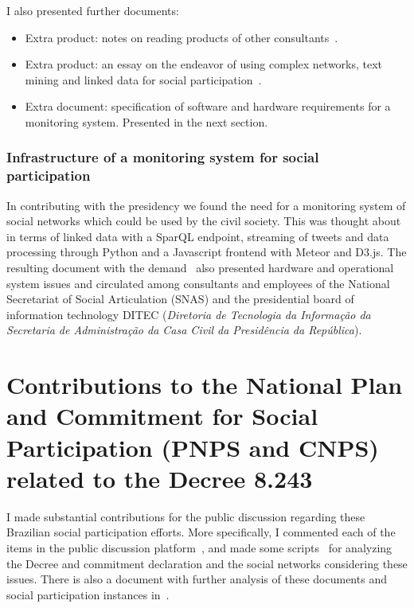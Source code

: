 \begin{apendicesenv}
I also presented further documents:
\begin{itemize}
	\item Extra product: notes on reading products of other consultants~\cite{pnudExtra}.
	\item Extra product: an essay on the endeavor of using complex networks, text mining and linked data for social participation~\cite{ensaio}.
	\item Extra document: specification of software and hardware requirements for a monitoring system. Presented in the next section.
\end{itemize}

\subsubsection{Infrastructure of a monitoring system for social participation}\label{sec:monitoring}
In contributing with the presidency we found the need for a monitoring system of social networks
which could be used by the civil society.
This was thought about in terms of linked data with a SparQL endpoint, streaming of tweets and data processing through Python
and a Javascript frontend with Meteor and D3.js.
The resulting document with the demand~\cite{sm} also presented hardware and operational system issues
and circulated among consultants and employees of the National Secretariat of Social Articulation (SNAS) and 
the presidential board of information technology DITEC (\emph{Diretoria de Tecnologia da Informação da Secretaria de Administração da Casa Civil da Presidência da República}).

\section{Contributions to the National Plan and Commitment for Social Participation (PNPS and CNPS) related to the Decree 8.243}
I made substantial contributions for the public discussion regarding these Brazilian social participation
efforts.
More specifically, I commented each of the items in the public discussion platform~\cite{participaPNPS},
and made some scripts~\cite{analisePNPS,pcPS} for analyzing the Decree and commitment declaration and the social networks considering these issues.
There is also a document with further analysis of these documents and social participation instances in~\cite{lmPS}.


\end{apendicesenv}

